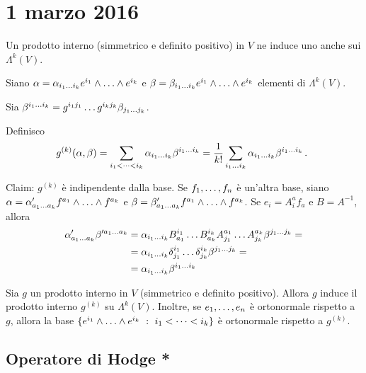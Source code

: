 \chapter{1 marzo 2016}

Un prodotto interno (simmetrico e definito positivo) in $V$ ne induce uno anche sui $\Lambda^k(V)$.

Siano $\alpha = \alpha_{\seqb ik{}} e^{i_1}\wedge\ldots\wedge e^{i_k}$ e $\beta = \beta_{\seqb ik{}} e^{i_1}\wedge\ldots\wedge e^{i_k}$ elementi di $\Lambda^k(V)$.

Sia $\beta^{\seqb ik{}} = g^{i_1j_1}\ldots g^{i_kj_k} \beta_{\seqb jk{}}$.

Definisco
\begin{equation*}
	g^{(k)} (\alpha,\beta) = \sum_{\seqb ik<} \alpha_{\seqb ik{}} \beta^{\seqb ik{}} 
	= \frac 1{k!} \sum_{\seqb ik{}} \alpha_{\seqb ik{}} \beta^{\seqb ik{}} \punto
\end{equation*}

Claim: $g^{(k)}$ è indipendente dalla base.
Se $\seqb fn,$ è un'altra base, siano $\alpha = \alpha'_{\seqb ak{}} f^{a_1}\wedge\ldots\wedge f^{a_k}$ e $\beta = \beta'_{\seqb ak{}} f^{a_1}\wedge\ldots\wedge f^{a_k}$. Se $e_i =  A^a_i f_a$ e $B=A^{-1}$, allora
\begin{align*}
	\alpha'_{\seqb ak{}} \beta'^{\seqb ak{}} &= \alpha_{\seqb ik{}} B^{i_1}_{a_1}\ldots B^{i_k}_{a_k} A^{a_1}_{j_1}\ldots A^{a_k}_{j_k} \beta^{\seqb jk{}}= \\
	&= \alpha_{\seqb ik{}} \delta^{i_1}_{j_1}\ldots \delta^{i_k}_{j_k}\beta^{\seqb jk{}} = \\
	&=\alpha_{\seqb ik{}} \beta^{\seqb ik{}}
\end{align*}

\begin{proposition}
	Sia $g$ un prodotto interno in $V$ (simmetrico e definito positivo). Allora $g$ induce il prodotto interno $g^{(k)}$ su $\Lambda^k(V)$. Inoltre, se $\seqb en,$ è ortonormale rispetto a $g$, allora la base $\{e^{i_1}\wedge\ldots\wedge e^{i_k} \suchthat \seqb ik< \}$ è ortonormale rispetto a $g^{(k)}$.
\end{proposition}

\section{Operatore di Hodge *}

